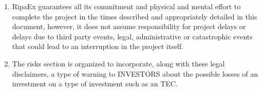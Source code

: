\documentclass[11pt,fleqn]{book} %
\begin{document}
\begin{scriptsize}
{\begin{enumerate}
			terms defined in this document.
			\item RipaEx guarantees all its commitment and physical and mental
			effort to complete the project in the times described
			and appropriately detailed in this document, however,
			it does not assume responsibility for project delays or
			delays due to third party events, legal, administrative or
			catastrophic events that could lead to an interruption in
			the project itself.
			\item The risks section is organized to incorporate, along with
			these legal disclaimers, a type of warning to INVESTORS
			about the possible losses of an investment on a type of
			investment such as an TEC.
		\end{enumerate}		
	}
\end{scriptsize}

\nocite{*}
\printbibliography[title={References}]
\newpage
~\vfill
\thispagestyle{empty}
\listoftodos
\end{document}
